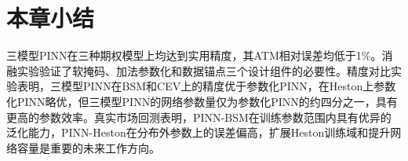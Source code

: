 \section{本章小结}\label{sec:exp_summary}

三模型PINN在三种期权模型上均达到实用精度，其ATM相对误差均低于1\%。消融实验验证了软掩码、加法参数化和数据锚点三个设计组件的必要性。精度对比实验表明，三模型PINN在BSM和CEV上的精度优于参数化PINN，在Heston上参数化PINN略优，但三模型PINN的网络参数量仅为参数化PINN的约四分之一，具有更高的参数效率。真实市场回测表明，PINN-BSM在训练参数范围内具有优异的泛化能力，PINN-Heston在分布外参数上的误差偏高，扩展Heston训练域和提升网络容量是重要的未来工作方向。
